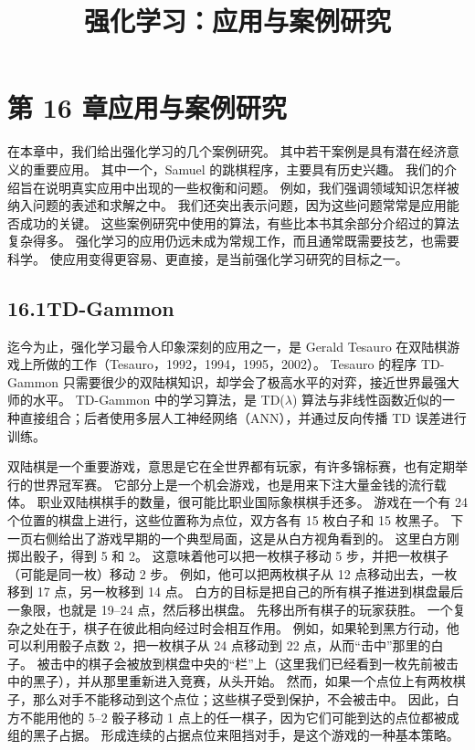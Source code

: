 \documentclass[UTF8,12pt,a4paper,fontset=fandol]{ctexart}
\title{强化学习：应用与案例研究}
\author{}
\date{}
\begin{document}
\maketitle

\section*{第 16 章\quad 应用与案例研究}

在本章中，我们给出强化学习的几个案例研究。
其中若干案例是具有潜在经济意义的重要应用。
其中一个，Samuel 的跳棋程序，主要具有历史兴趣。
我们的介绍旨在说明真实应用中出现的一些权衡和问题。
例如，我们强调领域知识怎样被纳入问题的表述和求解之中。
我们还突出表示问题，因为这些问题常常是应用能否成功的关键。
这些案例研究中使用的算法，有些比本书其余部分介绍过的算法复杂得多。
强化学习的应用仍远未成为常规工作，而且通常既需要技艺，也需要科学。
使应用变得更容易、更直接，是当前强化学习研究的目标之一。

\subsection*{16.1\quad TD-Gammon}

迄今为止，强化学习最令人印象深刻的应用之一，是 Gerald Tesauro 在双陆棋游戏上所做的工作（Tesauro，1992，1994，1995，2002）。
Tesauro 的程序 TD-Gammon 只需要很少的双陆棋知识，却学会了极高水平的对弈，接近世界最强大师的水平。
TD-Gammon 中的学习算法，是 TD($\lambda$) 算法与非线性函数近似的一种直接组合；后者使用多层人工神经网络（ANN），并通过反向传播 TD 误差进行训练。

双陆棋是一个重要游戏，意思是它在全世界都有玩家，有许多锦标赛，也有定期举行的世界冠军赛。
它部分上是一个机会游戏，也是用来下注大量金钱的流行载体。
职业双陆棋棋手的数量，很可能比职业国际象棋棋手还多。
游戏在一个有 24 个位置的棋盘上进行，这些位置称为点位，双方各有 15 枚白子和 15 枚黑子。
下一页右侧给出了游戏早期的一个典型局面，这是从白方视角看到的。
这里白方刚掷出骰子，得到 5 和 2。
这意味着他可以把一枚棋子移动 5 步，并把一枚棋子（可能是同一枚）移动 2 步。
例如，他可以把两枚棋子从 12 点移动出去，一枚移到 17 点，另一枚移到 14 点。
白方的目标是把自己的所有棋子推进到棋盘最后一象限，也就是 19--24 点，然后移出棋盘。
先移出所有棋子的玩家获胜。
一个复杂之处在于，棋子在彼此相向经过时会相互作用。
例如，如果轮到黑方行动，他可以利用骰子点数 2，把一枚棋子从 24 点移动到 22 点，从而“击中”那里的白子。
被击中的棋子会被放到棋盘中央的“栏”上（这里我们已经看到一枚先前被击中的黑子），并从那里重新进入竞赛，从头开始。
然而，如果一个点位上有两枚棋子，那么对手不能移动到这个点位；这些棋子受到保护，不会被击中。
因此，白方不能用他的 5--2 骰子移动 1 点上的任一棋子，因为它们可能到达的点位都被成组的黑子占据。
形成连续的占据点位来阻挡对手，是这个游戏的一种基本策略。
\end{document}

